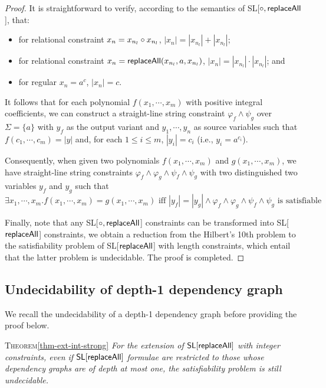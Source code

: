 \begin{proof}
{		It is straightforward to verify, according to the semantics of SL[$\circ, \mathsf{replaceAll}$], that:
		\begin{itemize}
			\item for relational constraint $x_n= x_{n_l}\circ x_{n_l}$, $|x_n|= |x_{n_l}|+|x_{n_l}|$; 
			\item for relational constraint $x_n= \mathsf{replaceAll}(x_{n_l}, a, x_{n_l})$,  $|x_n|= |x_{n_l}|\cdot |x_{n_l}|$; and 
			\item for regular $x_n=a^c$, $|x_n|=c$. 
		\end{itemize}
		
		It follows that for each polynomial $f(x_1, \cdots, x_m)$ with positive integral coefficients, we can construct a straight-line string constraint $\varphi_{f}\wedge\psi_g$ over $\Sigma=\{a\}$ with $y_f$ as the output variant and $y_1, \cdots, y_n$ as source variables such that
		$f(c_1, \cdots, c_m)=|y|$ and, for each $1\leq i\leq m$, $|y_i|= c_i$ (i.e., $y_i=a^{c_i}$).  
		
		Consequently, when given two polynomials $f(x_1, \cdots, x_m)$ and $g(x_1, \cdots, x_m)$, we have straight-line string constraints $\varphi_{f}\wedge \varphi_{g}\wedge \psi_{f}\wedge \psi_g$ with two distinguished two variables  $y_f$ and $y_g$ such that  
		\[\exists x_1, \cdots, x_m. f(x_1, \cdots, x_m)=g(x_1, \cdots, x_m)\mbox{ iff } |y_f|=|y_g|\wedge \varphi_{f}\wedge \varphi_{g}\wedge \psi_{f}\wedge \psi_g\mbox{ is satisfiable} \]
		
		Finally, note that any  SL[$\circ, \mathsf{replaceAll}$] constraints can be transformed into SL[$\mathsf{replaceAll}$] constraints, we obtain a reduction from the Hilbert's 10th problem to the satisfiability problem of  SL[$\mathsf{replaceAll}$] with length constraints, which entail that the latter problem is undecidable. The proof is completed. 
	}
\end{proof}

\subsection{Undecidability of depth-1 dependency graph}

We recall the undecidability of a depth-1 dependency graph before providing the proof below.

\medskip

\noindent\textsc{Theorem}\ref{thm-ext-int-strong}
{\em
	For the extension of $\mathsf{SL}[\mathsf{replaceAll}]$ with integer constraints, even if $\mathsf{SL}[\mathsf{replaceAll}]$ formulae are restricted to those whose dependency graphs are of depth at most one, the satisfiability problem is still undecidable.
}

